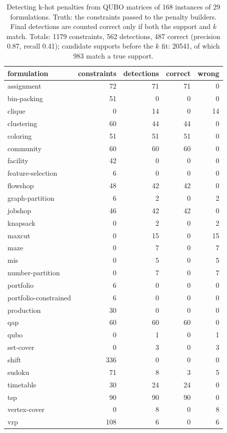 \begin{table}[t]\centering\small
\caption{Detecting k-hot penalties from QUBO matrices of 168 instances of 29 formulations. Truth: the constraints passed to the penalty builders. Final detections are counted correct only if both the support and $k$ match. Totals: 1179 constraints, 562 detections, 487 correct (precision 0.87, recall 0.41); candidate supports before the $k$ fit: 20541, of which 983 match a true support.}
\label{tab:detect}
\begin{tabular}{lrrrr}\toprule
formulation & constraints & detections & correct & wrong\\\midrule
assignment & 72 & 71 & 71 & 0\\
bin-packing & 51 & 0 & 0 & 0\\
clique & 0 & 14 & 0 & 14\\
clustering & 60 & 44 & 44 & 0\\
coloring & 51 & 51 & 51 & 0\\
community & 60 & 60 & 60 & 0\\
facility & 42 & 0 & 0 & 0\\
feature-selection & 6 & 0 & 0 & 0\\
flowshop & 48 & 42 & 42 & 0\\
graph-partition & 6 & 2 & 0 & 2\\
jobshop & 46 & 42 & 42 & 0\\
knapsack & 0 & 2 & 0 & 2\\
maxcut & 0 & 15 & 0 & 15\\
maze & 0 & 7 & 0 & 7\\
mis & 0 & 5 & 0 & 5\\
number-partition & 0 & 7 & 0 & 7\\
portfolio & 6 & 0 & 0 & 0\\
portfolio-constrained & 6 & 0 & 0 & 0\\
production & 30 & 0 & 0 & 0\\
qap & 60 & 60 & 60 & 0\\
qubo & 0 & 1 & 0 & 1\\
set-cover & 0 & 3 & 0 & 3\\
shift & 336 & 0 & 0 & 0\\
sudoku & 71 & 8 & 3 & 5\\
timetable & 30 & 24 & 24 & 0\\
tsp & 90 & 90 & 90 & 0\\
vertex-cover & 0 & 8 & 0 & 8\\
vrp & 108 & 6 & 0 & 6\\
\bottomrule\end{tabular}\end{table}
